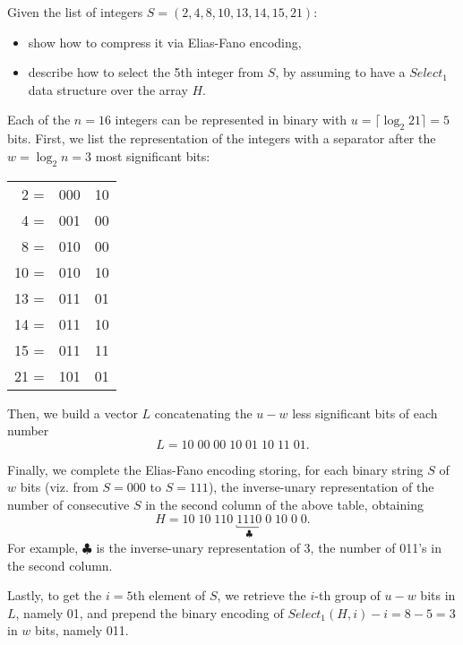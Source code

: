 \exercise

Given the list of integers $S=(2,4,8,10,13,14,15,21)$:
%
\begin{itemize}
  \item show how to compress it via Elias-Fano encoding,
  \item describe how to select the 5th integer from $S$, by assuming to have a $Select_1$ data structure over the array $H$.
\end{itemize}

\solution

Each of the $n=16$ integers can be represented in binary with $u=\lceil\log_2
21\rceil=5$ bits. First, we list the representation of the integers with a
separator after the $w=\log_2n=3$ most significant bits:
%
\begin{center}
  \begin{tabular}{ r || r | l }
     2 = & 000 & 10 \\
     4 = & 001 & 00 \\
     8 = & 010 & 00 \\
    10 = & 010 & 10 \\
    13 = & 011 & 01 \\
    14 = & 011 & 10 \\
    15 = & 011 & 11 \\
    21 = & 101 & 01
  \end{tabular}
\end{center}
%
Then, we build a vector  $L$ concatenating the $u-w$ less significant bits of
each number 
%
$$L = 10\; 00\; 00\; 10\; 01\; 10\; 11\; 01.$$

Finally, we complete the Elias-Fano encoding storing, for each binary string $S$
of $w$ bits (viz. from $S=000$ to $S=111$), the inverse-unary representation of
the number of consecutive $S$ in the second column of the above table, obtaining
%
$$H=10\;10\;110\;\underbracket{1110}_{\clubsuit}\;0\;10\;0\;0.$$
%
For example, $\clubsuit$ is the inverse-unary representation of 3, the number of
011's in the second column.

Lastly, to get the $i=5$th element of $S$, we retrieve the $i$-th group of $u-w$
bits in $L$, namely 01, and prepend the binary encoding of $Select_1(H,
i)-i=8-5=3$ in $w$ bits, namely 011.
